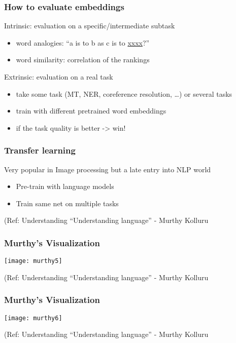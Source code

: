 \begin{frame}[fragile]\frametitle{How to evaluate embeddings}
Intrinsic: evaluation on a specific/intermediate subtask
\begin{itemize}
\item  word analogies: “a is to b as c is to \underline{xxxx}?” 
\item  word similarity: correlation of the rankings
\end{itemize}
Extrinsic: evaluation on a real task
\begin{itemize}
\item  take some task (MT, NER, coreference resolution, …) or several tasks
\item   train with different pretrained word embeddings
\item  if the task quality is better -> win!
\end{itemize}
\end{frame}


\begin{frame}[fragile]\frametitle{Transfer learning}
Very popular in Image processing but a late entry into NLP world

\begin{itemize}
\item Pre-train with language models
\item Train same net on multiple tasks
\end{itemize}

{\tiny (Ref: Understanding ``Understanding language'' - Murthy Kolluru}

\end{frame}

\begin{frame}[fragile]\frametitle{Murthy's Visualization}

\begin{center}
\texttt{[image: murthy5]}

{\tiny (Ref: Understanding ``Understanding language'' - Murthy Kolluru}

\end{center}

\end{frame}

\begin{frame}[fragile]\frametitle{Murthy's Visualization}

\begin{center}
\texttt{[image: murthy6]}

{\tiny (Ref: Understanding ``Understanding language'' - Murthy Kolluru}

\end{center}

\end{frame}

